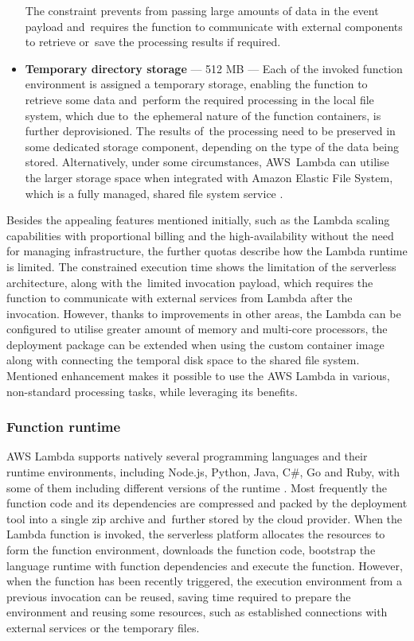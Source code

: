 \begin{itemize}
   The constraint prevents from passing large amounts of data in the event payload and~requires the function to communicate with external components to retrieve or~save the processing results if required.
   \item \textbf{Temporary directory storage} --- 512 MB --- Each of the invoked function environment is assigned a temporary storage, enabling the function to retrieve some data and~perform the required processing in the local file system, which due to~the ephemeral nature of the function containers, is further deprovisioned. The results of~the processing need to be preserved in some dedicated storage component, depending on the type of the data being stored. Alternatively, under some circumstances, AWS~Lambda can utilise the larger storage space when integrated with Amazon Elastic File System, which is a fully managed, shared file system service \cite{AWSLambdaEFS}.
\end{itemize}

Besides the appealing features mentioned initially, such as the Lambda scaling capabilities with proportional billing and the high-availability without the need for managing infrastructure, the further quotas describe how the Lambda runtime is limited.
The constrained execution time shows the limitation of the serverless architecture, along with the~limited invocation payload, which requires the function to communicate with external services from Lambda after the invocation. However, thanks to improvements in other areas, the Lambda can be configured to utilise greater amount of memory and multi-core processors, the deployment package can be extended when using the custom container image along with connecting the temporal disk space to the shared file system.
Mentioned enhancement makes it possible to use the AWS Lambda in various, non-standard processing tasks, while leveraging its benefits.

\subsubsection{Function runtime} \label{chapter:lambda-custom-runtimes}

AWS Lambda supports natively several programming languages and their runtime environments, including Node.js, Python, Java, C\#, Go and Ruby, with some of them including different versions of the runtime \cite{AWSLambdaRuntimes}. Most frequently the function code and its dependencies are compressed and packed by the deployment tool into a single zip archive and~further stored by the cloud provider. When the Lambda function is invoked, the serverless platform allocates the resources to form the function environment, downloads the function code, bootstrap the language runtime with function dependencies and execute the function. However, when the function has been recently triggered, the execution environment from a previous invocation can be reused, saving time required to prepare the environment and reusing some resources, such as established connections with external services or the temporary files.

